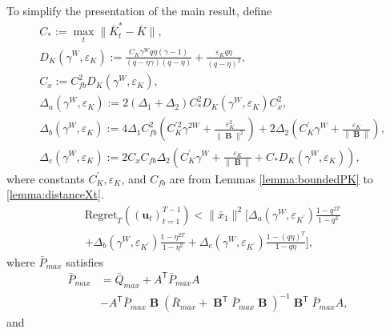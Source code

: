 \documentclass[letterpaper, 10 pt, conference]{ieeeconf}  %
\newcommand{\transpose}{\mathsf{T}}
\DeclareMathOperator{\contB}{\mathbf{B}}
\begin{document}
To simplify the presentation of the main result, define
\begin{align*}
    &C_{*} := \max_{t} \|\bar{K}_{t}^{*}-\bar{K}\|,\\
    &D_{K}(\gamma^{W},\varepsilon_{K}) := \frac{C_{K}\gamma^{W}q\eta(\gamma-1)}{(q-\eta\gamma)(q-\eta)} + \frac{\varepsilon_{K}q\eta}{(q-\eta)^{2}},\\
    &C_{x} := C_{fb}^{2}D_{K}(\gamma^{W},\varepsilon_{K}),\\
    &\Delta_{a}(\gamma^{W},\varepsilon_{K}) := 2(\Delta_{1}+\Delta_{2})C_{*}^{2}D_{K}(\gamma^{W},\varepsilon_{K})C_{x}^{2},\\
    &\Delta_{b}(\gamma^{W},\varepsilon_{K}) := 4\Delta_{1}C_{fb}^{2}(C_{K}^{'2}\gamma^{2W}+\frac{\varepsilon_{K}^{2}}{\|\contB\|^{2}} )+2\Delta_{2}(C_{K}^{'}\gamma^{W}+\frac{\varepsilon_{K}}{\|\contB\|}),\\
    &\Delta_{c}(\gamma^{W},\varepsilon_{K}) := 2C_{x}C_{fb}\Delta_{2}(C_{K}^{'}\gamma^{W}+\frac{\varepsilon_{K}}{\|\contB\|}+C_{*}D_{K}(\gamma^{W},\varepsilon_{K})),
\end{align*}
where constants $C^{'}_{K}, \varepsilon_{K}$, and $C_{fb}$ are from Lemmas \ref{lemma:boundedPK} to \ref{lemma:distanceXt}.
\begin{align*}
        &\text{Regret}_{T}((\mathbf{u}_{t})_{t=1}^{T-1})< \|\bar{x}_{1}\|^{2}\bigg[\Delta_{a}(\gamma^{W},\varepsilon_{K^{'}})\frac{1-q^{2T}}{1-q^{2}}\\
        &+  \Delta_{b}(\gamma^{W},\varepsilon_{K^{'}})\frac{1-\eta^{2T}}{1-\eta^{2}}+ \Delta_{c}(\gamma^{W},\varepsilon_{K^{'}})\frac{1-(q\eta)^{T}}{1-q\eta}\bigg],
    \end{align*}
    where $\bar{P}_{max}$ satisfies
    \begin{align*}
        \bar{P}_{max} &= \bar{Q}_{max} + A^{\transpose}\bar{P}_{max}A \\
        &- A^{\transpose}\bar{P}_{max}\contB(\bar{R}_{max}+\contB^{\transpose}\bar{P}_{max}\contB)^{-1}\contB^{\transpose}\bar{P}_{max}A,
    \end{align*}
    and
\end{document}
